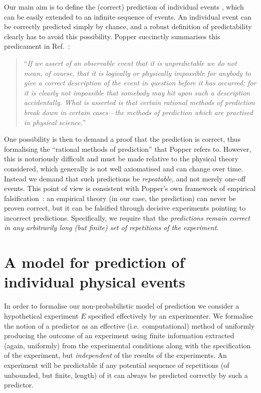 \documentclass[%
 superscriptaddress,
 preprint,
 showpacs,
 showkeys,
 preprintnumbers,
 nofootinbib,
  amsmath,amssymb,
  aps,
 pra,
  longbibliography,
  floatfix,
 ]{revtex4-1}
\theoremstyle{definition}
\begin{document}
Our main aim is to define the (correct) prediction of individual events \cite{Eagle:2005ys}, which can be easily extended to an infinite sequence of events.
An individual event can be correctly predicted simply by chance, and a robust definition of predictability clearly has to  avoid this possibility.
Popper succinctly summarises this predicament in Ref.~\cite[117--118]{popper-50i}:
\begin{quote}
``\emph{If we assert of an observable event that it is unpredictable we do not mean, of course, that it is logically or physically impossible for anybody to give a correct description of the event in question before it has occurred;
for it is clearly not impossible that somebody may hit upon such a description accidentally.
What is asserted is that certain rational methods of prediction break down in certain cases---the methods of prediction which are practised in physical science.}''
\end{quote}

One possibility is then to demand a proof that the prediction is correct,  thus formalising the ``rational methods of prediction'' that Popper refers to.
However, this is notoriously difficult and must be made relative to the physical theory considered, which generally is not well axiomatised and can change over time.
Instead we demand that such predictions be \emph{repeatable}, and not merely one-off events.
This point of view is consistent with Popper's own framework of empirical falsification~\cite{popper,popper-en}: an empirical theory (in our case, the prediction) can never be proven correct, but it can be falsified through decisive experiments pointing to incorrect predictions.
Specifically, we require that the \emph{predictions remain correct in any arbitrarily long (but finite) set of repetitions of the experiment.}


\section{A model for prediction of individual physical events}

In order to formalise our non-probabilistic model of prediction we consider a hypothetical experiment $E$ specified effectively by an experimenter.
We formalise the notion of a predictor as an effective (i.e.\ computational) method of uniformly producing the outcome of an experiment using finite information extracted (again, uniformly) from the experimental conditions along with the specification of the experiment, but \emph{independent} of the results of the experiments. 
An experiment will be predictable if any potential sequence of repetitions (of unbounded, but finite,  length) of it can always be predicted correctly by such a predictor.
\end{document}
